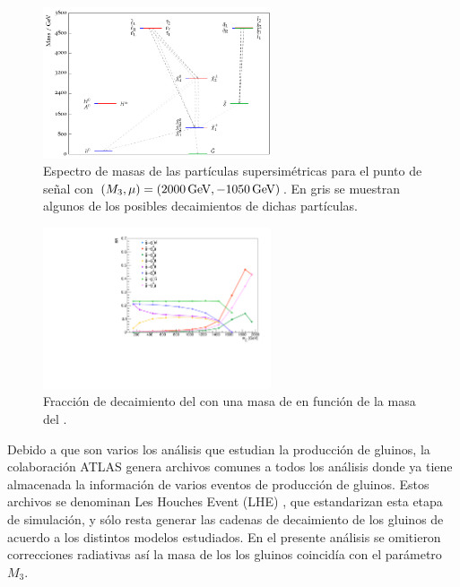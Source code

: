 \begin{figure}
  \centering
  \includegraphics[width=0.6\textwidth]{images/analysis/phb_mass_spectrum.pdf}
  \caption{Espectro de masas de las partículas supersimétricas para el punto de señal con $(M_3, \mu) = (2000\,\text{GeV}, -1050\,\text{GeV})$. En gris se muestran algunos de los posibles decaimientos de dichas partículas.}
  \label{fig:mass_spec}
\end{figure}

\begin{figure}
  \centering
  \includegraphics[width=0.6\textwidth]{images/analysis/phb_go_br.pdf}
  \caption{Fracción de decaimiento del \gluino con una masa de  en función de la masa del \ninoone.}
  \label{fig:gluino_decays}
\end{figure}


Debido a que son varios los análisis que estudian la producción de gluinos, la colaboración ATLAS genera archivos comunes a todos los análisis donde ya tiene almacenada la información de varios eventos de producción de gluinos. Estos archivos se denominan Les Houches Event (LHE) \cite{Alwall:2006yp}, que estandarizan esta etapa de simulación, y sólo resta generar las cadenas de decaimiento de los gluinos de acuerdo a los distintos modelos estudiados. En el presente análisis se omitieron correcciones radiativas así la masa de los los gluinos coincidía con el parámetro $M_3$.

